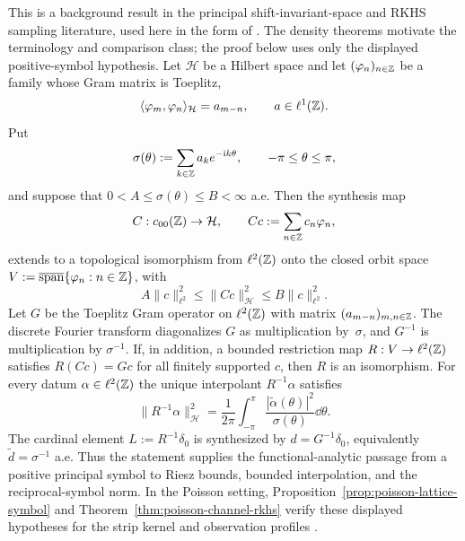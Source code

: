 \smallskip
\begin{lemma}%
\label{lem:imported-principal-symbol-sampling}
This is a background result in the principal shift-invariant-space and
RKHS sampling literature, used here in the form of
\cite{deBoorDeVoreRon1994,RonShen1995,Bownik2000,AldroubiGrochenig2001,NashedWalter1991,NashedSun2010,ChengJiangSun2016}.
The density theorems
\cite{Beurling1989,Landau1967,Seip1992,FuhrGrochenigHaimiKlotzRomero2018}
motivate the terminology and comparison class; the proof below uses only the
displayed positive-symbol hypothesis.
Let $\mathcal H$ be a Hilbert space and let
$(\varphi_n)_{n\in\mathbb{Z}}$ be a family whose Gram matrix is Toeplitz,
\[
\langle\varphi_m,\varphi_n\rangle_{\mathcal H}=a_{m-n},
\qquad a\in\ell^1(\mathbb{Z}).
\]
Put
\[
\sigma(\theta):=\sum_{k\in\mathbb{Z}}a_ke^{-\mathrm{i} k\theta},
\qquad -\pi\le\theta\le\pi,
\]
and suppose that $0<A\le\sigma(\theta)\le B<\infty$ a.e.  Then the
synthesis map
\[
C:c_{00}(\mathbb{Z})\to\mathcal H,
\qquad Cc:=\sum_{n\in\mathbb{Z}}c_n\varphi_n,
\]
extends to a topological isomorphism from $\ell^2(\mathbb{Z})$ onto the closed
orbit space $V:=\overline{\operatorname{span}}\{\varphi_n:n\in\mathbb{Z}\}$, with
\[
A\|c\|_{\ell^2}^2\le\|Cc\|_{\mathcal H}^2
\le B\|c\|_{\ell^2}^2.
\]
Let $G$ be the Toeplitz Gram operator on $\ell^2(\mathbb{Z})$ with matrix
$(a_{m-n})_{m,n\in\mathbb{Z}}$.  The discrete Fourier transform diagonalizes
$G$ as multiplication by~$\sigma$, and $G^{-1}$ is multiplication by
$\sigma^{-1}$.  If, in addition, a bounded restriction map
$R:V\to\ell^2(\mathbb{Z})$ satisfies $R(Cc)=Gc$ for all finitely supported $c$,
then $R$ is an isomorphism.  For every datum $\alpha\in\ell^2(\mathbb{Z})$ the
unique interpolant $R^{-1}\alpha$ satisfies
\begin{equation}\label{eq:imported-reciprocal-symbol-norm}
\|R^{-1}\alpha\|_{\mathcal H}^2
=\frac1{2\pi}\int_{-\pi}^{\pi}
\frac{|\widetilde\alpha(\theta)|^2}{\sigma(\theta)}\dd\theta .
\end{equation}
The cardinal element $L:=R^{-1}\delta_0$ is synthesized by
$d=G^{-1}\delta_0$, equivalently $\widetilde d=\sigma^{-1}$ a.e.
Thus the statement supplies the functional-analytic passage from a positive
principal symbol to Riesz bounds, bounded interpolation, and the
reciprocal-symbol norm.  In the Poisson setting,
Proposition~\ref{prop:poisson-lattice-symbol} and
Theorem~\ref{thm:poisson-channel-rkhs} verify these displayed hypotheses for
the strip kernel and observation profiles
\cite{deBoorDeVoreRon1994,RonShen1995,AldroubiGrochenig2001}.
\end{lemma}
